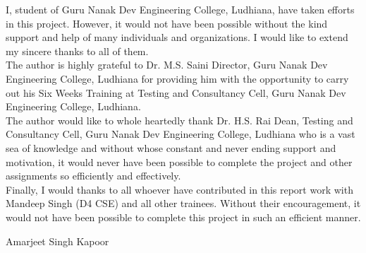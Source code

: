 \begin{Large}
\end{Large}

I, student of Guru Nanak Dev Engineering College, Ludhiana, have taken efforts in this project.
However, it would not have been possible without the kind support and help of many individuals
and organizations. I would like to extend my sincere thanks to all of them.\\

The author is highly grateful to Dr. M.S. Saini Director, Guru Nanak Dev Engineering College, Ludhiana for providing him with the opportunity to carry out his Six Weeks Training at
Testing and Consultancy Cell, Guru Nanak Dev Engineering College, Ludhiana.\\

The author would like to whole heartedly thank Dr. H.S. Rai Dean, Testing and Consultancy
Cell, Guru Nanak Dev Engineering College, Ludhiana who is a vast sea of knowledge and without whose constant and never ending support and motivation, it would never have been possible to complete the project and other assignments so efficiently and effectively.\\

Finally, I would thanks to all whoever have contributed in
this report work with Mandeep Singh (D4 CSE) and all other trainees. Without their 
encouragement, it would not have been possible to complete this project
in such an efficient manner.





\vskip 1.0cm 
\noindent Amarjeet Singh Kapoor
